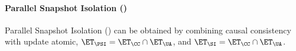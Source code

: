 
\paragraph{Parallel Snapshot Isolation (\PSI)} 
Parallel Snapshot Isolation (\PSI) can be obtained by combining causal consistency with update atomic, 
$\ET_{\PSI} = \ET_{\CC} \cap \ET_{\UA}$, and $\ET_{\SI} = \ET_{\CC} \cap \ET_{\UA}$.

